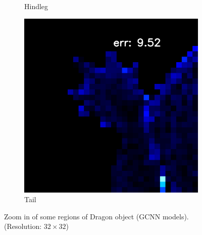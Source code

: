 \begin{figure}[th]
\begin{subfigure}[b]{0.18\linewidth}
		\caption{Hindleg}
	\end{subfigure}
	\begin{subfigure}[b]{0.18\linewidth}
		\includegraphics[width=\linewidth]{./Figures/gcnn_synthetic/eval_7_12_-48_error.png}
		\caption{Tail}
	\end{subfigure}
	
	\decoRule
	\caption{Zoom in of some regions of Dragon object (GCNN models). (Resolution: $ 32\times32 $)}
	\label{fig:gcnn-eval-synthetic-zoom-in}
\end{figure}


